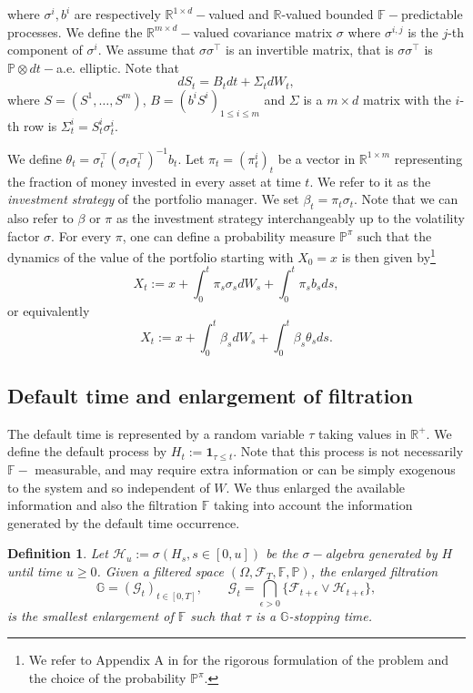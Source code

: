 \documentclass[11pt,a4paper]{article}
\theoremstyle{thmstyleone}%
\theoremstyle{thmstyletwo}%
\theoremstyle{thmstylethree}%
\newtheorem{definition}{Definition}%
\newcommand{\F}{\mathbb{F}}
\newcommand{\G}{\mathbb{G}}
\newcommand{\ind}{\mathbf{1}}
\begin{document}
where $\sigma^i,b^i$ are respectively $\mathbb R^{1\times d}-$valued and  $\mathbb R$-valued bounded $\mathbb F-$predictable processes. We define the $\mathbb R^{m\times d}-$valued covariance matrix $\sigma$ where $\sigma^{i,j}$ is the $j$-th component of $\sigma^i$. We assume that $\sigma\sigma^\top$ is an invertible matrix, that is $\sigma\sigma^\top$ is $\mathbb P\otimes dt-$a.e. elliptic. Note that 
\[dS_t = B_t dt+\Sigma_t dW_t,\]
where $S=(S^1,\dots,S^m)$, $B=(b^i S^i)_{1\leq i\leq m}$ and $\Sigma$ is a $m\times d$ matrix with the $i$-th row is $\Sigma^i_t=S_t^i \sigma^i_t$.

We define $\theta_t = \sigma_t^\top (\sigma_t \sigma_t^\top)^{-1} b_t$. Let $\pi_t = (\pi_t^i)_t$ be a vector in $\mathbb R^{1\times m}$ representing the fraction of money invested in every asset at time $t$. We refer to it as the \textit{investment strategy} of the portfolio manager. We set $\beta_t = \pi_t \sigma_t$. Note that we can also refer to $\beta$ or $\pi$ as the investment strategy interchangeably up to the volatility factor $\sigma$. For every $\pi$, one can define a probability measure $\mathbb P^\pi$ such that the dynamics of the value of the portfolio  starting with $X_0 = x$ is then given by\footnote{We refer to Appendix A in \cite{baldacci2022governmental} for the rigorous formulation of the problem and the choice of the probability $\mathbb P^\pi$.}
\[
    X_t := x + \int_0^t \pi_s \sigma_s dW_s + \int_0^t \pi_s b_s ds, \]
    or equivalently
\[ X_t:= x + \int_0^t \beta_s dW_s + \int_0^t \beta_s \theta_s ds.
\]


   


\subsection{Default time and enlargement of filtration}
The default time is represented by a random variable $\tau$ taking values in $\mathbb R^+$. We define the default process by $H_t := \ind_{\tau \leq t}$. Note that this process is not necessarily $\mathbb F-$ measurable, and may require extra information or can be simply exogenous to the system and so independent of $W$. We thus enlarged the available information and also the filtration $\mathbb F$ taking into account the information generated by the default time occurrence. 
\begin{definition}
   Let $\mathcal H_u:=\sigma(H_s, s \in [0, u])$ be the $\sigma-$algebra generated by $H$ until time $u\geq 0$. Given a filtered space $(\Omega, \mathcal{F}_T, \F, \mathbb{P})$, the enlarged filtration
    \[
        \G = (\mathcal{G}_t)_{t \in [0,T]}, \qquad \mathcal{G}_t = \underset{\epsilon > 0}{\bigcap} \{ \mathcal{F}_{t+\epsilon} \vee \mathcal H_{t +\epsilon} \},
    \]
    is the smallest enlargement of $\F$ such that $\tau$ is a $\G$-stopping time.
\end{definition}
\end{document}
